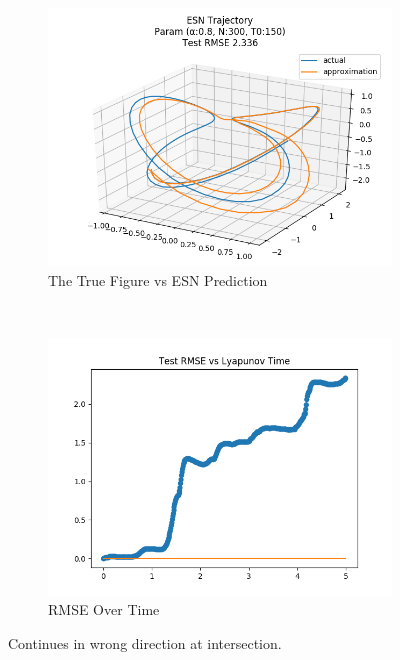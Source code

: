 \documentclass{article}
\begin{document}
\begin{figure}[H]
    \centering
    \begin{subfigure}[b]{0.45\textwidth}
        \includegraphics[width=\textwidth]{doc/paper/images/lorenz/rank_1_param_230_fit.png}
        \caption{The True Figure vs ESN Prediction}
        \label{fig:lorenz_r1_fit}
    \end{subfigure}
    ~
    \begin{subfigure}[b]{0.45\textwidth}
        \includegraphics[width=\textwidth]{doc/paper/images/lorenz/rank_1_param_230_rmse.png}
        \caption{RMSE Over Time}
        \label{fig:lorenz_r1_rmse}
    \end{subfigure}
    \caption{Continues in wrong direction at intersection.}
    \label{fig:lorenz_r1}
\end{figure}
\end{document}
